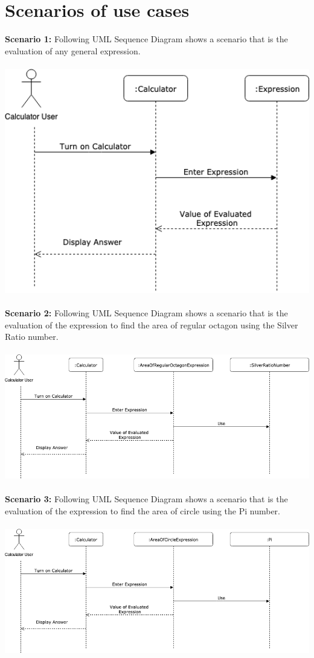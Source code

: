 \section{Scenarios of use cases}
\textbf{Scenario 1:} Following UML Sequence Diagram shows a scenario that is the evaluation of any general expression.\\ \\
\includegraphics[width=1.0\textwidth]{images/s1.png} \\ \\
\textbf{Scenario 2:} Following UML Sequence Diagram shows a scenario that is the evaluation of the expression to find the area of regular octagon using the Silver Ratio number.\\ \\
\includegraphics[width=1.0\textwidth]{images/s2.png} \\ \\
\textbf{Scenario 3:} Following UML Sequence Diagram shows a scenario that is the evaluation of the expression to find the area of circle using the Pi number.\\ \\
\includegraphics[width=1.0\textwidth]{images/s3.png}

